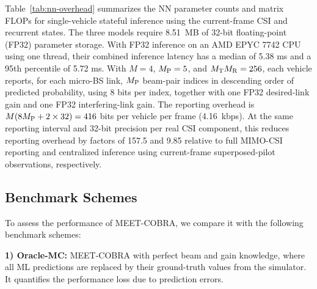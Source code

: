 \documentclass[10pt,journal,letterpaper]{journal_template/IEEEtran}
\newcommand{\rev}[1]{\textcolor{revisioncolor}{{}#1}}
\theoremstyle{remark}
\begin{document}
\rev{Table~\ref{tab:nn-overhead} summarizes the NN parameter counts and matrix FLOPs for single-vehicle stateful inference using the current-frame CSI and recurrent states. The three models require 8.51~MB of 32-bit floating-point (FP32) parameter storage. With FP32 inference on an AMD EPYC 
7742 CPU using one thread, their combined inference latency has a median of \rev{5.38} ms and a 95th percentile of \rev{5.72} ms. With $M=4$, $M_{\rm P}=5$, and $M_{\rm T}M_{\rm R}=256$, each vehicle reports, for each micro-BS link, $M_{\rm P}$ beam-pair indices in descending order of predicted probability, using 8 bits per index, together with one FP32 desired-link gain and one FP32 interfering-link gain. The \rev{reporting overhead} is $M(8M_{\rm P}+2\times32)=416$ bits per vehicle per frame (4.16~kbps). At the same reporting interval and 32-bit precision per real CSI component, this reduces \rev{reporting overhead} by factors of 157.5 and 9.85 relative to full MIMO-CSI reporting and centralized inference using current-frame superposed-pilot observations, respectively.}



\subsection{Benchmark Schemes}
\label{subsec:benchmarks}

To assess the performance of MEET-COBRA, we compare it with the following benchmark schemes:


\textbf{1) Oracle-MC:} MEET-COBRA with perfect beam and gain knowledge, where all ML predictions are replaced by their ground-truth values from the simulator. It quantifies the performance loss due to prediction errors.
\end{document}

